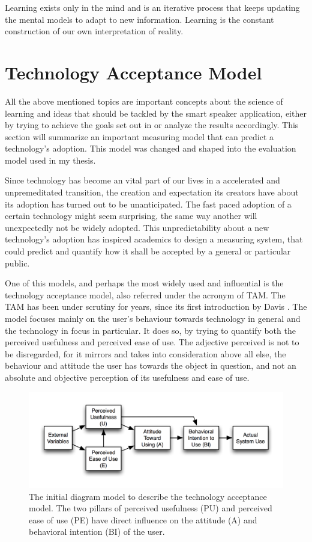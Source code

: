 Learning exists only in the mind and is an iterative process that keeps updating the
mental models to adapt to new information. Learning is the constant construction 
of our own interpretation of reality.


\section{Technology Acceptance Model}
\label{section:tam}


All the above mentioned topics are important concepts about the science of learning
and ideas that should be tackled by the smart speaker application, either by 
trying to achieve the goals set out in  or analyze
the results accordingly. This section 
will summarize an important measuring model that can predict a technology's adoption.
This model was changed and shaped into the evaluation model used in my thesis.

Since technology has become an vital part of our lives in a accelerated and 
unpremeditated transition, the creation and expectation its creators have about its
adoption has turned out to be unanticipated. The fast paced adoption of a certain
technology might seem surprising, the same way another will unexpectedly not be 
widely adopted. This unpredictability about a new technology's adoption has inspired
academics to design a measuring system, that could predict and quantify how it 
shall be accepted by a general or particular public.

One of this models, and perhaps the most widely used and influential is the 
technology acceptance model, also referred under the acronym of TAM.
The TAM has been under scrutiny for years, since its first introduction by Davis
\cite{davis_1986}.
The model focuses mainly on the user's behaviour towards technology in general and
the technology in focus in particular. It does so, by trying to quantify both the
perceived usefulness and perceived ease of use. The adjective perceived is not to 
be disregarded, for it mirrors and takes into consideration above all else, the 
behaviour and attitude the user has towards the object in question, and not an
absolute and objective perception of its usefulness and ease of use.

\begin{figure}
    \centering
    \includegraphics[width=16cm]{images/tam.png}
    \caption{The initial diagram model to describe the technology acceptance model. The two pillars
        of perceived usefulness (PU) and perceived ease of use (PE) have direct influence on the
        attitude (A) and behavioral intention (BI) of the user.
    }
    \label{fig:tam}
\end{figure}

